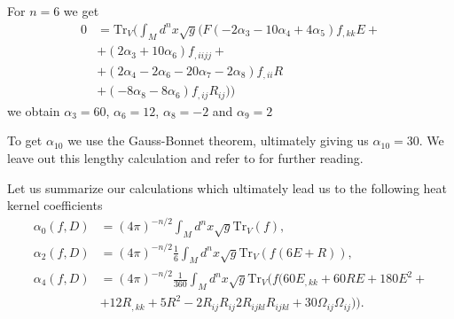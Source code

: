 For $n=6$ we get
\begin{align}
    0 &= \text{Tr}_V(\int_Md^nx\sqrt{g}
    (F(-2\alpha_3-10\alpha_4+4\alpha_5)f_{,kk}E +\nonumber\\
    &+(2\alpha_3 + 10\alpha_6)f_{,iijj}+\nonumber\\
    &+(2\alpha_4 -2\alpha_6 - 20\alpha_7 -2\alpha_8)f_{,ii}R\nonumber\\
    &+(-8\alpha_8 -8\alpha_6)f_{,ij}R_{ij}))
\end{align}
we obtain $\alpha_3 = 60$, $\alpha_6=12$, $\alpha_8 = -2$ and $\alpha_9 = 2$

To get $\alpha_{10}$ we use the Gauss-Bonnet theorem, ultimately giving us
$\alpha_{10}=30$. We leave out this lengthy calculation and refer to
\cite{heatkernel} for further reading.

Let us summarize our calculations which ultimately lead us to the following heat kernel
coefficients
\begin{align}
    \alpha_0(f, D) &= (4\pi)^{-n/2}\int_M d^n x \sqrt{g} \text{Tr}_V(f),\\
    \alpha_2(f, D) &= (4\pi)^{-n/2}\frac{1}{6}\int_M d^n x \sqrt{g}
    \text{Tr}_V(f(6E+R)),\\
    \alpha_4(f, D) &= (4\pi)^{-n/2}\frac{1}{360}\int_M d^n x \sqrt{g}
    \text{Tr}_V(f(60E_{,kk}+60RE+ 180E^2 +\\
    &+12R_{,kk} + 5R^2 - 2 R_{ij}R_{ij}
    2R_{ijkl}R_{ijkl} +30\Omega_{ij}\Omega_{ij})).\label{eq: a_4}
\end{align}

